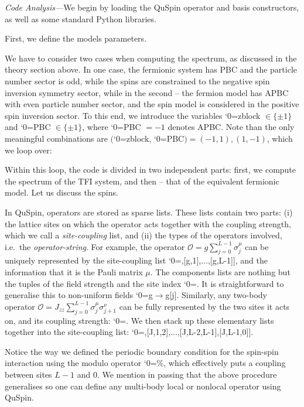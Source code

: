 \documentclass{SciPost}
\newcommand\0{\scalebox{-1}[1]{0}}
\let\svttfamily\ttfamily
\renewcommand\ttfamily{\svttfamily\catcode`0=\active }
\renewcommand\texttt{\bgroup\ttfamily\texttthelp}
\def\texttthelp#1{#1\egroup}
\newcommand{\JWcode}{example6.py}
\begin{document}
\noindent\emph{Code Analysis---}We begin by loading the QuSpin operator and basis constructors, as well as some standard Python libraries. 

First, we define the models parameters.

We have to consider two cases when computing the spectrum, as discussed in the theory section above. In one case, the fermionic system has PBC and the particle number sector is odd, while the spins are constrained to the negative spin inversion symmetry sector, while in the second -- the fermion model has APBC with even particle number sector, and the spin model is considered in the positive spin inversion sector. To this end, we introduce the variables \texttt{zblock} $\in\{\pm 1\}$ and \texttt{PBC} $\in\{\pm 1\}$, where \texttt{PBC} $=-1$ denotes APBC. Note than the only meaningful combinations are $($\texttt{zblock}, \texttt{PBC}$)=(-1,1),(1,-1)$, which we loop over:

Within this loop, the code is divided in two independent parts: first, we compute the spectrum of the TFI system, and then -- that of the equivalent fermionic model. Let us discuss the spins. 

In QuSpin, operators are stored as sparse lists. These lists contain two parts: (i) the lattice sites on which the operator acts together with the coupling strength, which we call a \emph{site-coupling} list, and (ii) the types of the operators involved, i.e.~the \emph{operator-string}. For example, the operator $\mathcal{O}=g\sum_{j=0}^{L-1}\sigma^\mu_j$ can be uniquely represented by the site-coupling list \texttt{[[g,0],[g,1],$\dots$,[g,L-1]]}, and the information that it is the Pauli matrix $\mu$. The components lists are nothing but the tuples of the field strength and the site index \texttt{[g,j]}. It is straightforward to generalise this to non-uniform fields \texttt{g$\to $g[j]}. Similarly, any two-body operator $\mathcal{O}=J_{zz}\sum_{j=0}^{L-1}\sigma^\mu_j\sigma^\nu_{j+1}$ can be fully represented by the two sites it acts on, and its coupling strength: \texttt{[J,j,j+1]}. We then stack up these elementary lists together into the site-coupling list: \texttt{[[J,0,1],[J,1,2],$\dots$,[J,L-2,L-1],[J,L-1,0]]}. 

Notice the way we defined the periodic boundary condition for the spin-spin interaction using the modulo operator \texttt{\%}, which effectively puts a coupling between sites $L-1$ and $0$. We mention in passing that the above procedure generalises so one can define any multi-body local or nonlocal operator using QuSpin. 
\end{document}

